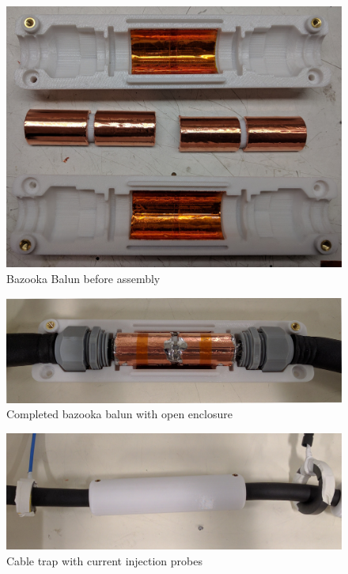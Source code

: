 \begin{figure}
\includegraphics[width=6in]{figures/bazooka_parts.jpg}
\caption{Bazooka Balun before assembly}
\label{fig:bazooka_parts}
\end{figure}

\begin{figure}
\includegraphics[width=6in]{figures/bazooka_assembled.jpg}
\caption{Completed bazooka balun with open enclosure}
\label{fig:bazooka_assembled}
\end{figure}
\clearpage
\newpage

\begin{figure}
\includegraphics[width=6in]{figures/bazooka_under_test.jpg}
\caption{Cable trap with current injection probes}
\label{fig:bazooka_under_test}
\end{figure}
\clearpage
\newpage

